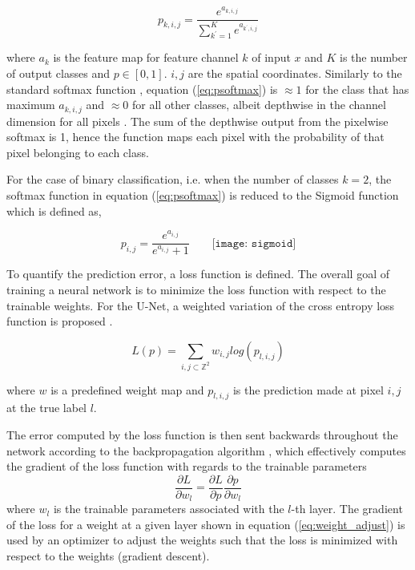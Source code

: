 \documentclass[../main/thesis.tex]{subfiles}
\begin{document}
\begin{equation}
    \label{eq:psoftmax}
    p_{k,i,j} = \frac{e^{a_{k,i,j}}}{\sum_{k^{\prime} = 1}^Ke^{a_{k^\prime,i,j}}}
\end{equation}

where $a_k$ is the feature map for feature channel $k$ of input $x$ and $K$ is the number of output classes and $p \in \left[0, 1\right]$. $i,j$ are the spatial coordinates. Similarly to the standard softmax function \citep{Bridle1990}, equation (\ref{eq:psoftmax}) is $\approx 1$ for the class that has maximum $a_{k,i,j}$ and $\approx 0$ for all other classes, albeit depthwise in the channel dimension for all pixels \citep{Ronneberger2015}. The sum of the depthwise output from the pixelwise softmax is 1, hence the function maps each pixel with the probability of that pixel belonging to each class. 

For the case of binary classification, i.e. when the number of classes $k=2$, the softmax function in equation (\ref{eq:psoftmax}) is reduced to the Sigmoid function which is defined as, 

\begin{equation}
    p_{i,j} = \frac{e^{a_{i,j}}}{e^{a_{i,j}} + 1} \qquad
    \texttt{[image: sigmoid]}
\end{equation}

To quantify the prediction error, a loss function is defined. The overall goal of training a neural network is to minimize the loss function with respect to the trainable weights. For the U-Net, a weighted variation of the cross entropy loss function is proposed \citep{Ronneberger2015}. 

\begin{equation}
    L(p) = \sum_{i,j \subset \mathbb{Z}^2}w_{i,j}log(p_{l,i,j})
\end{equation}

where $w$ is a predefined weight map and $p_{l,i,j}$ is the prediction made at pixel $i,j$ at the true label $l$.

The error computed by the loss function is then sent backwards throughout the network according to the backpropagation algorithm \citep{Rumelhart1986}, which effectively computes the gradient of the loss function with regards to the trainable parameters 
\begin{equation}
    \label{eq:weight_adjust}
    \frac{\partial L}{\partial w_l} = \frac{\partial L}{\partial p}\frac{\partial p}{\partial w_l}
\end{equation}
where $w_l$ is the trainable parameters associated with the $l$-th layer. The gradient of the loss for a weight at a given layer shown in equation (\ref{eq:weight_adjust}) is used by an optimizer to adjust the weights such that the loss is minimized with respect to the weights (gradient descent).
\end{document}

